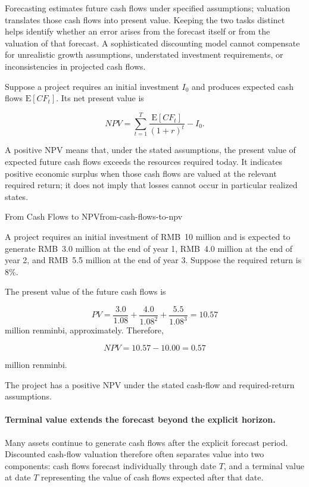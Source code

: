 Forecasting estimates future cash flows under specified assumptions; valuation translates those cash flows into present value. Keeping the two tasks distinct helps identify whether an error arises from the forecast itself or from the valuation of that forecast. A sophisticated discounting model cannot compensate for unrealistic growth assumptions, understated investment requirements, or inconsistencies in projected cash flows.

Suppose a project requires an initial investment $I_0$ and produces expected cash flows $\mathrm{E}[CF_t]$. Its net present value is

\begin{equation}
NPV=\sum_{t=1}^{T}
\frac{\mathrm{E}[CF_t]}{(1+r)^t}-I_0.
\label{eq:ch5-npv}
\end{equation}

A positive NPV means that, under the stated assumptions, the present value of expected future cash flows exceeds the resources required today. It indicates positive economic surplus when those cash flows are valued at the relevant required return; it does not imply that losses cannot occur in particular realized states.

\begin{example}{From Cash Flows to NPV}{from-cash-flows-to-npv}


A project requires an initial investment of RMB~10 million and is expected to generate RMB~3.0 million at the end of year 1, RMB~4.0 million at the end of year 2, and RMB~5.5 million at the end of year 3. Suppose the required return is 8\%.

The present value of the future cash flows is

$$
PV=\frac{3.0}{1.08}+\frac{4.0}{1.08^2}+\frac{5.5}{1.08^3}=10.57
$$
million renminbi, approximately. Therefore,

$$
NPV=10.57-10.00=0.57
$$

million renminbi.

The project has a positive NPV under the stated cash-flow and required-return assumptions.

\end{example}

\paragraph{Terminal value extends the forecast beyond the explicit horizon.}

Many assets continue to generate cash flows after the explicit forecast period. Discounted cash-flow valuation therefore often separates value into two components: cash flows forecast individually through date $T$, and a terminal value at date $T$ representing the value of cash flows expected after that date.

